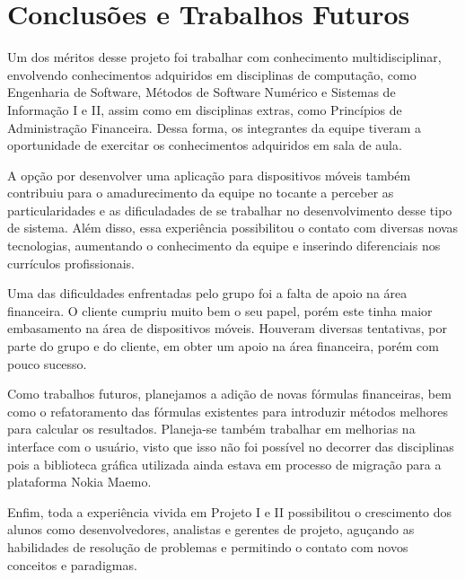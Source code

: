 \chapter{Conclusões e Trabalhos Futuros}

Um dos méritos desse projeto foi trabalhar com conhecimento multidisciplinar, envolvendo 
conhecimentos adquiridos em disciplinas de computação, como Engenharia de Software, Métodos de
Software Numérico e Sistemas de Informação I e II, assim como em disciplinas extras, como
Princípios de Administração Financeira. Dessa forma, os integrantes da equipe tiveram a
oportunidade de exercitar os conhecimentos adquiridos em sala de aula.

A opção por desenvolver uma aplicação para dispositivos móveis também contribuiu para o amadurecimento
da equipe no tocante a perceber as particularidades e as dificuladades de se trabalhar no desenvolvimento desse tipo
de sistema. Além disso, essa experiência possibilitou o contato com diversas novas tecnologias,
aumentando o conhecimento da equipe e inserindo diferenciais nos currículos profissionais.

Uma das dificuldades enfrentadas pelo grupo foi a falta de apoio na área financeira. O cliente
cumpriu muito bem o seu papel, porém este tinha maior embasamento na área de dispositivos móveis.
Houveram diversas tentativas, por parte do grupo e do cliente, em obter um apoio na área financeira,
porém com pouco sucesso.

Como trabalhos futuros, planejamos a adição de novas fórmulas financeiras, bem como o refatoramento
das fórmulas existentes para introduzir métodos melhores para calcular os resultados. Planeja-se
também trabalhar em melhorias na interface com o usuário, visto que isso não foi possível no
decorrer das disciplinas pois a biblioteca gráfica utilizada ainda estava em processo de migração
para a plataforma Nokia Maemo.

Enfim, toda a experiência vivida em Projeto I e II possibilitou o crescimento dos alunos como
desenvolvedores, analistas e gerentes de projeto, aguçando as habilidades de resolução
de problemas e permitindo o contato com novos conceitos e paradigmas.
